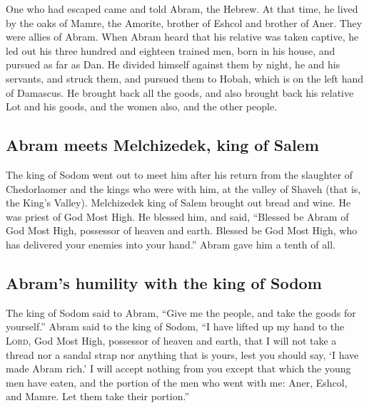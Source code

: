  One who had escaped came and told Abram, the Hebrew. At
that time, he lived by the oaks of Mamre, the Amorite, brother of Eshcol
and brother of Aner. They were allies of Abram.  When
Abram heard that his relative was taken captive, he led out his three
hundred and eighteen trained men, born in his house, and pursued as far
as Dan.  He divided himself against them by night, he and
his servants, and struck them, and pursued them to Hobah, which is on
the left hand of Damascus.  He brought back all the
goods, and also brought back his relative Lot and his goods, and the
women also, and the other people.

\hypertarget{abram-meets-melchizedek-king-of-salem}{%
\subsection{Abram meets Melchizedek, king of
Salem}\label{abram-meets-melchizedek-king-of-salem}}

 The king of Sodom went out to meet him after his return
from the slaughter of Chedorlaomer and the kings who were with him, at
the valley of Shaveh (that is, the King's Valley). 
Melchizedek king of Salem brought out bread and wine. He was priest of
God Most High.  He blessed him, and said, ``Blessed be
Abram of God Most High, possessor of heaven and earth. 
Blessed be God Most High, who has delivered your enemies into your
hand.'' Abram gave him a tenth of all.

\hypertarget{abrams-humility-with-the-king-of-sodom}{%
\subsection{Abram's humility with the king of
Sodom}\label{abrams-humility-with-the-king-of-sodom}}

 The king of Sodom said to Abram, ``Give me the people,
and take the goods for yourself.''  Abram said to the
king of Sodom, ``I have lifted up my hand to the \textsc{Lord}, God Most
High, possessor of heaven and earth,  that I will not
take a thread nor a sandal strap nor anything that is yours, lest you
should say, `I have made Abram rich.'  I will accept
nothing from you except that which the young men have eaten, and the
portion of the men who went with me: Aner, Eshcol, and Mamre. Let them
take their portion.''

